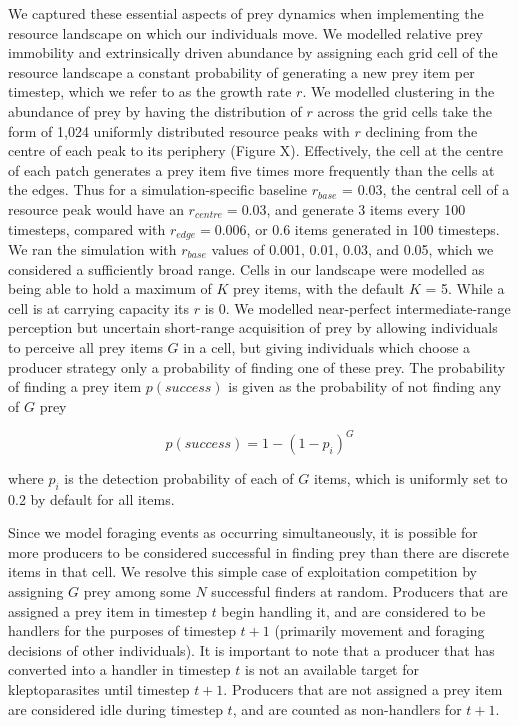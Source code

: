 \documentclass[11pt]{article}
\begin{document}
We captured these essential aspects of prey dynamics when implementing the resource landscape on which our individuals move.
We modelled relative prey immobility and extrinsically driven abundance by assigning each grid cell of the resource landscape a constant probability of generating a new prey item per timestep, which we refer to as the growth rate $r$.
We modelled clustering in the abundance of prey by having the distribution of $r$ across the grid cells take the form of 1,024 uniformly distributed resource peaks with $r$ declining from the centre of each peak to its periphery (Figure X).
Effectively, the cell at the centre of each patch generates a prey item five times more frequently than the cells at the edges.
Thus for a simulation-specific baseline $r_{base}$ = 0.03, the central cell of a resource peak  would have an $r_{centre} = 0.03$, and generate 3 items every 100 timesteps, compared with $r_{edge} = 0.006$, or 0.6 items generated in 100 timesteps.
We ran the simulation with $r_{base}$ values of 0.001, 0.01, 0.03, and 0.05, which we considered a sufficiently broad range. 
Cells in our landscape were modelled as being able to hold a maximum of $K$ prey items, with the default $K$ = 5.
While a cell is at carrying capacity its $r$ is 0.
We modelled near-perfect intermediate-range perception but uncertain short-range acquisition of prey by allowing individuals to perceive all prey items $G$ in a cell, but giving individuals which choose a producer strategy only a probability of finding one of these prey.
The probability of finding a prey item $p(success)$ is given as the probability of not finding any of $G$ prey
\begin{linenomath*}
    \begin{equation*}
        p({success}) = 1 - \left(1 - p_i\right) ^ G
    \end{equation*}
\end{linenomath*}
where $p_i$ is the detection probability of each of $G$ items, which is uniformly set to 0.2 by default for all items.

Since we model foraging events as occurring simultaneously, it is possible for more producers to be considered successful in finding prey than there are discrete items in that cell.
We resolve this simple case of exploitation competition by assigning $G$ prey among some $N$ successful finders at random.
Producers that are assigned a prey item in timestep $t$ begin handling it, and are considered to be handlers for the purposes of timestep $t+1$ (primarily movement and foraging decisions of other individuals).
It is important to note that a producer that has converted into a handler in timestep $t$ is not an available target for kleptoparasites until timestep $t+1$.
Producers that are not assigned a prey item are considered idle during timestep $t$, and are counted as non-handlers for $t+1$.
\end{document}
